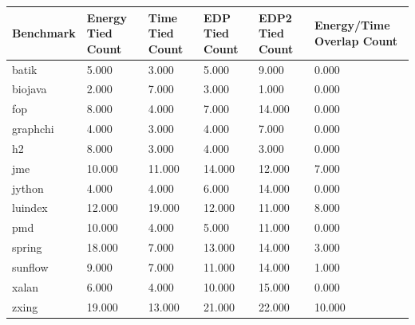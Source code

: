 \begin{tabular}{llllll}
\hline
Benchmark & Energy Tied Count & Time Tied Count & EDP Tied Count & EDP2 Tied Count & Energy/Time Overlap Count \\
\hline
batik & 5.000 & 3.000 & 5.000 & 9.000 & 0.000 \\
biojava & 2.000 & 7.000 & 3.000 & 1.000 & 0.000 \\
fop & 8.000 & 4.000 & 7.000 & 14.000 & 0.000 \\
graphchi & 4.000 & 3.000 & 4.000 & 7.000 & 0.000 \\
h2 & 8.000 & 3.000 & 4.000 & 3.000 & 0.000 \\
jme & 10.000 & 11.000 & 14.000 & 12.000 & 7.000 \\
jython & 4.000 & 4.000 & 6.000 & 14.000 & 0.000 \\
luindex & 12.000 & 19.000 & 12.000 & 11.000 & 8.000 \\
pmd & 10.000 & 4.000 & 5.000 & 11.000 & 0.000 \\
spring & 18.000 & 7.000 & 13.000 & 14.000 & 3.000 \\
sunflow & 9.000 & 7.000 & 11.000 & 14.000 & 1.000 \\
xalan & 6.000 & 4.000 & 10.000 & 15.000 & 0.000 \\
zxing & 19.000 & 13.000 & 21.000 & 22.000 & 10.000 \\
\hline
\end{tabular}
